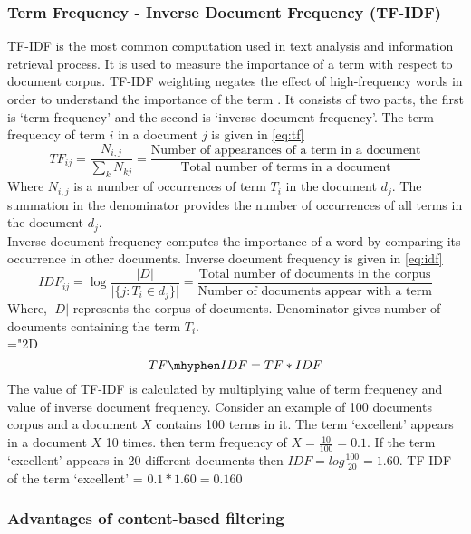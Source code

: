 \subsubsection{Term Frequency - Inverse Document Frequency (TF-IDF)}
\label{sec:tf-idf}
TF-IDF is the most common computation used in text analysis and information retrieval process. It is used to measure the importance of a term with respect to document corpus. TF-IDF weighting negates the effect of high-frequency words in order to understand the importance of the term \cite{47}. It consists of two parts, the first is `term frequency' and the second is `inverse document frequency'. The term frequency of term $i$ in a document $j$ is given in \autoref{eq:tf}
\begin{equation}
TF_{ij} = \frac{N_{i,j}}{\sum_{k} N_{kj}} = \frac{\textrm{Number of appearances of a term in a document}}{\textrm{Total number of terms in a document}}
\label{eq:tf}
\end{equation}
\noindent Where $N_{i,j}$ is a number of occurrences of term $T_{i}$ in the document $d_j$. The summation in the denominator provides the number of occurrences of all terms in the document $d_j$.
\\
\noindent Inverse document frequency computes the importance of a word by comparing its occurrence in other documents. Inverse document frequency is given in \autoref{eq:idf}
\begin{equation}
IDF_{ij} =\log \frac{\vert D \vert}{\vert\{j:T_i \in d_j \} \vert} = \frac{\textrm{Total number of documents in the corpus}}{\textrm{Number of documents appear with a term}}
\label{eq:idf}
\end{equation}
\noindent Where, $\vert D \vert$ represents the corpus of documents. Denominator gives number of documents containing the term $T_i$.
\\
\mathchardef\mhyphen="2D
\begin{equation}
TF\mhyphen IDF = TF * IDF
\label{eq:tfidf}
\end{equation}
\noindent The value of TF-IDF is calculated by multiplying value of term frequency and value of inverse document frequency. Consider an example of 100 documents corpus and a document $X$ contains 100 terms in it. The term `excellent' appears in a document $X$ 10 times. then term frequency of $X = \frac{10}{100} = 0.1$. If the term `excellent' appears in 20 different documents then $IDF = log\frac{100}{20} = 1.60. $ TF-IDF of the term `excellent' = $0.1 * 1.60 = 0.160 $


\subsubsection{Advantages of content-based filtering}

